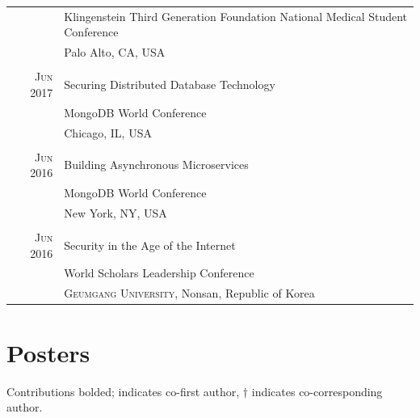 \documentclass[a4paper,10pt]{article}
\begin{document}
\begin{tabular}{rp{11cm}}
 								 & Klingenstein Third Generation Foundation National Medical Student Conference \\
 								 & Palo Alto, CA, USA  \\
 \multicolumn{2}{c}{} \\
 \textsc{Jun} 2017 & Securing Distributed Database Technology \\
 								 & MongoDB World Conference\\
 								 & Chicago, IL, USA  \\
 \multicolumn{2}{c}{} \\
 \textsc{Jun} 2016 & Building Asynchronous Microservices \\
 								 & MongoDB World Conference\\
 								 & New York, NY, USA  \\
 \multicolumn{2}{c}{} \\
 \textsc{Jun} 2016 & Security in the Age of the Internet\\
 							    &  World Scholars Leadership Conference\\
 							    &  \textsc{Geumgang University}, Nonsan, Republic of Korea \\
\end{tabular}

\newpage
\section{Posters}
Contributions bolded; {\bf *} indicates co-first author, {\bf $\dag$} indicates co-corresponding author.
\end{document}
